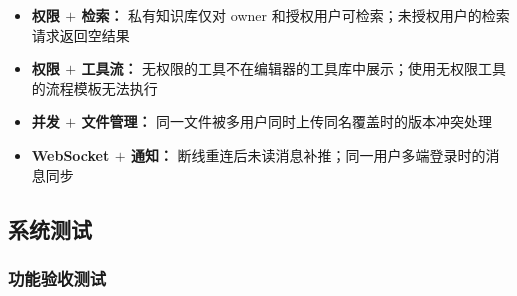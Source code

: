 \documentclass[a4paper,zihao=-4]{ctexart}
\begin{document}
\begin{itemize}
  \item \textbf{权限 $+$ 检索：} 私有知识库仅对 owner 和授权用户可检索；未授权用户的检索请求返回空结果
  \item \textbf{权限 $+$ 工具流：} 无权限的工具不在编辑器的工具库中展示；使用无权限工具的流程模板无法执行
  \item \textbf{并发 $+$ 文件管理：} 同一文件被多用户同时上传同名覆盖时的版本冲突处理
  \item \textbf{WebSocket $+$ 通知：} 断线重连后未读消息补推；同一用户多端登录时的消息同步
\end{itemize}

\subsection{系统测试}

\subsubsection{功能验收测试}
\end{document}

